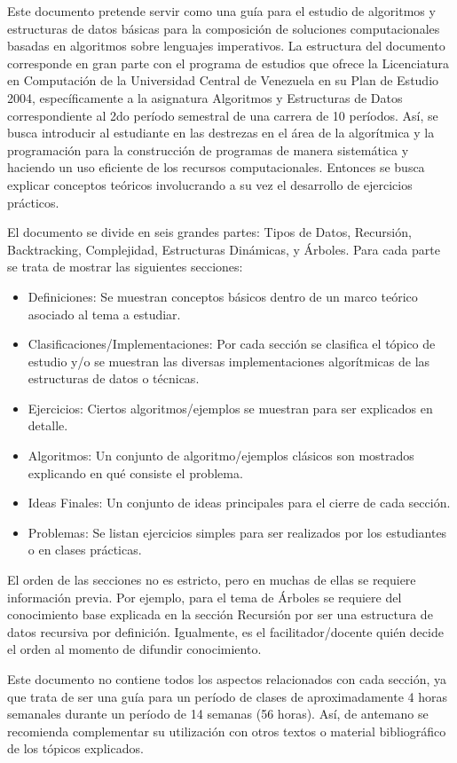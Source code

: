 
Este documento pretende servir como una guía para el estudio de algoritmos y estructuras de datos básicas para la composición de soluciones computacionales basadas en algoritmos sobre lenguajes imperativos. La estructura del documento corresponde en gran parte con el programa de estudios que ofrece la Licenciatura en Computación de la Universidad Central de Venezuela en su Plan de Estudio 2004, específicamente a la asignatura Algoritmos y Estructuras de Datos correspondiente al 2do período semestral de una carrera de 10 períodos. Así, se busca introducir al estudiante en las destrezas en el área de la algorítmica y la programación para la construcción de programas de manera sistemática y haciendo un uso eficiente de los recursos computacionales. Entonces se busca explicar conceptos teóricos involucrando a su vez el desarrollo de ejercicios prácticos.

El documento se divide en seis grandes partes: Tipos de Datos, Recursión, Backtracking, Complejidad, Estructuras Dinámicas, y Árboles. Para cada parte se trata de mostrar las siguientes secciones:
\begin{itemize}
\item Definiciones: Se muestran conceptos básicos dentro de un marco teórico asociado al tema a estudiar.
\item Clasificaciones/Implementaciones: Por cada sección se clasifica el tópico de estudio y/o se muestran las diversas implementaciones algorítmicas de las estructuras de datos o técnicas.
\item Ejercicios: Ciertos algoritmos/ejemplos se muestran para ser explicados en detalle.
\item Algoritmos: Un conjunto de algoritmo/ejemplos clásicos son mostrados explicando en qué consiste el problema.
\item Ideas Finales: Un conjunto de ideas principales para el cierre de cada sección.
\item Problemas: Se listan ejercicios simples para ser realizados por los estudiantes o en clases prácticas.
\end{itemize}

El orden de las secciones no es estricto, pero en muchas de ellas se requiere información previa. Por ejemplo, para el tema de Árboles se requiere del conocimiento base explicada en la sección Recursión por ser una estructura de datos recursiva por definición. Igualmente, es el facilitador/docente quién decide el orden al momento de difundir conocimiento.

Este documento no contiene todos los aspectos relacionados con cada sección, ya que trata de ser una guía para un período de clases de aproximadamente 4 horas semanales durante un período de 14 semanas (56 horas). Así, de antemano se recomienda complementar su utilización con otros textos o material bibliográfico de los tópicos explicados.

